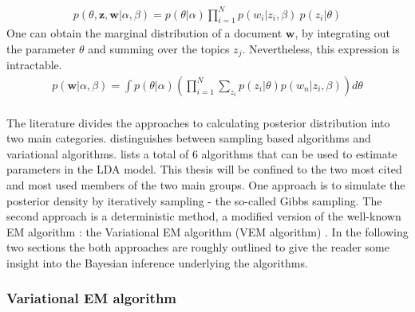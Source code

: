 \documentclass[11pt,a4paper]{article}
\begin{document}
\begin{align}\label{joint}
p(\theta,\textbf{z},\textbf{w}|\alpha,\beta)=p(\theta|\alpha)\prod_{i=1}^{N}p(w_i|z_i,\beta)\ p(z_i|\theta)
\end{align}
One can obtain the marginal distribution of a document $\textbf{w}$, by integrating out the parameter $\theta$ and summing over the topics $z_j$. Nevertheless, this expression is intractable.
\begin{align}\label{marginal}
p(\textbf{w}|\alpha, \beta)=\int p(\theta|\alpha) \left( \prod_{i=1}^{N} \sum_{z_i}p(z_i|\theta)p(w_n|z_i,\beta) \right) d\theta
\end{align}
\ \\
The literature divides the approaches to calculating posterior distribution into two main categories.\cite{Blei2012} distinguishes between sampling based algorithms and variational algorithms. \cite{Powieser2012} lists a total of 6 algorithms that can be used to estimate parameters in the LDA model. This thesis will be confined to the two most cited and most used members of the two main groups. One approach is to simulate the posterior density by iteratively sampling - the so-called Gibbs sampling. The second approach is a deterministic method, a modified version of the well-known EM algorithm \cite{Dempster1977}: the Variational EM algorithm (VEM algorithm) \cite{Wainwright2008}. In the following two sections the both approaches are roughly outlined to give the reader some insight into the Bayesian inference underlying the algorithms.

\subsubsection{Variational EM algorithm}
\end{document}
